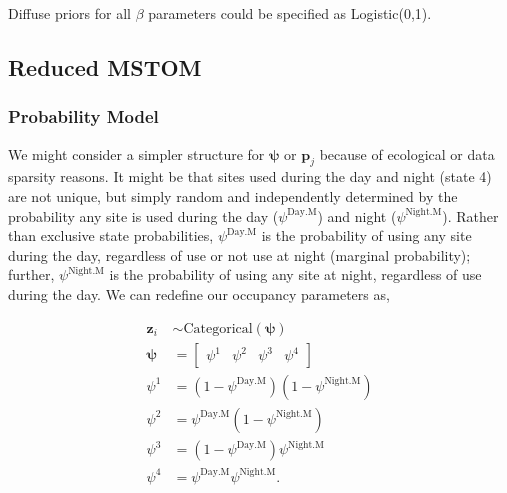 \documentclass[12pt]{article}
\begin{document}
Diffuse priors for all $\beta$ parameters could be specified as Logistic(0,1).

\subsection{Reduced MSTOM}
\subsubsection{Probability Model}
We might consider a simpler structure for $\boldsymbol{\psi}$ or $\boldsymbol{p}_{j}$ because of ecological or data sparsity reasons. It might be that sites used during the day and night (state 4) are not unique, but simply random and independently determined by the probability any site is used during the day ($\psi^{\text{Day.M}}$) and night ($\psi^{\text{Night.M}}$). Rather than exclusive state probabilities, $\psi^{\text{Day.M}}$ is the probability of using any site during the day, regardless of use or not use at night (marginal probability); further, $\psi^{\text{Night.M}}$ is the probability of using any site at night, regardless of use during the day.  We can redefine our occupancy parameters as,
\begin{center}
\begin{align*}
\textbf{z}_{i} &\sim \text{Categorical}(\boldsymbol{\psi})\\
\boldsymbol{\psi} &= \begin{bmatrix} \psi^1 & \psi^2 & \psi^3 & \psi^4 \end{bmatrix}\\
\psi^1 &=(1-\psi^{\text{Day.M}})(1-\psi^{\text{Night.M}})\\
\psi^2 &=\psi^{\text{Day.M}}(1-\psi^{\text{Night.M}})\\
\psi^3 &=(1-\psi^{\text{Day.M}})\psi^{\text{Night.M}}\\
\psi^4 &=\psi^{\text{Day.M}}\psi^{\text{Night.M}}.\\
\end{align*}
\end{center}
\end{document}

